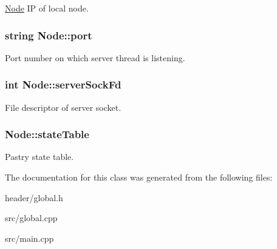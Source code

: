 \hyperlink{classNode}{Node} I\-P of local node. \hypertarget{classNode_adcf35fc0482227d0b62df69b685b94da}{
\subsubsection[{port}]{\setlength{\rightskip}{0pt plus 5cm}string Node\-::port}}\label{classNode_adcf35fc0482227d0b62df69b685b94da}
Port number on which server thread is listening. \hypertarget{classNode_a368d0971e95e5481cb17ce82145098bd}{
\subsubsection[{server\-Sock\-Fd}]{\setlength{\rightskip}{0pt plus 5cm}int Node\-::server\-Sock\-Fd}}\label{classNode_a368d0971e95e5481cb17ce82145098bd}
File descriptor of server socket. \hypertarget{classNode_a22dbe41a765f7d31f43f5996d2aedb91}{
\subsubsection[{state\-Table}]{ Node\-::state\-Table}}\label{classNode_a22dbe41a765f7d31f43f5996d2aedb91}
Pastry state table. 

The documentation for this class was generated from the following files\-:\begin{DoxyCompactItemize}
\item 
header/global.\-h\item 
src/global.\-cpp\item 
src/main.\-cpp\end{DoxyCompactItemize}
